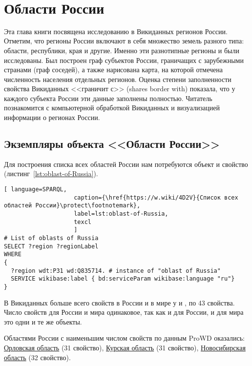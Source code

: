 ﻿﻿\chapter{Области России}
\label{ch:oblast-of-Russia}
Эта глава книги посвящена исследованию в Викиданных регионов России. 
Отметим, что регионы России включают в себя множество земель разного 
типа: области, республики, края и другие. Именно эти разнотипные регионы 
и были исследованы. Был построен граф субъектов России, граничащих 
с зарубежными странами (граф соседей), а также нарисована карта, 
на которой отмечена численность населения отдельных регионов. Оценка 
степени заполненности свойства Викиданных <<граничит с>> (shares border with) 
показала, что у каждого субъекта России эти данные заполнены полностью. 
Читатель познакомится с компьютерной обработкой Викиданных и визуализацией 
информации о регионах России.

\section{Экземпляры объекта <<Области России>>}

Для построения списка всех областей России нам потребуются объект 
 и свойство  
(листинг~\protect\ref{lst:oblast-of-Russia}).

\begin{lstlisting}[ language=SPARQL, 
                    caption={\href{https://w.wiki/4D2V}{Список всех областей России}\protect\footnotemark},
                    label=lst:oblast-of-Russia,
                    texcl 
                    ]
# List of oblasts of Russia
SELECT ?region ?regionLabel
WHERE
{
  ?region wdt:P31 wd:Q835714. # instance of "oblast of Russia"
  SERVICE wikibase:label { bd:serviceParam wikibase:language "ru"}
}
\end{lstlisting}%

В Викиданных больше всего свойств в России и в мире у 
 и , 
по 43 свойства\autocite{Russia_prowd}. 
Число свойств для России и мира одинаковое, так как и для России, и для мира это одни и те же объекты.

Областями России с наименьшим числом свойств по данным ProWD оказались: \href{http://www.wikidata.org/entity/Q3129}{Орловская область} (31 свойство), \href{http://www.wikidata.org/entity/Q3178}{Курская область} (31 свойство), \href{http://www.wikidata.org/entity/Q5851}{Новосибирская область} (32 свойство).

